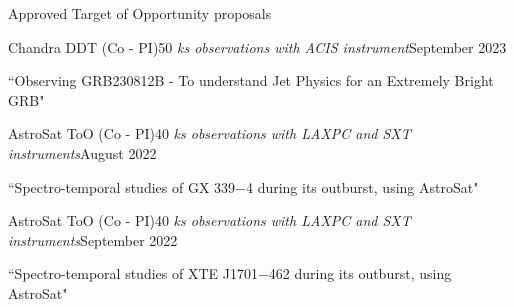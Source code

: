 \begin{section}{Approved Target of Opportunity proposals}
    \begin{subsectionnobullet}{Chandra DDT (Co - PI)}{50 \em{ks} observations with ACIS instrument}{September 2023}{}
        \item {``Observing GRB230812B - To understand Jet Physics for an Extremely Bright GRB"}    
    \end{subsectionnobullet}
            \vspace{-0.5em}
    \begin{subsectionnobullet}{AstroSat ToO (Co - PI)}{40 \em{ks} observations with LAXPC and SXT instruments}{August 2022}{}
        \item {``Spectro-temporal studies of GX 339$-$4 during its outburst, using AstroSat"}    
    \end{subsectionnobullet}
\vspace{-0.5em}

        \begin{subsectionnobullet}{AstroSat ToO (Co - PI)}{40 \em{ks} observations with LAXPC and SXT instruments}{September 2022}{}
        \item {``Spectro-temporal studies of XTE J1701$-$462 during its outburst, using AstroSat"}    
    \end{subsectionnobullet}
\end{section}